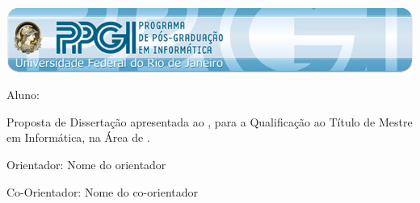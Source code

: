 


\begin{titlepage}

\begin{center}
\includegraphics[width=\textwidth]{ppgi.jpg}

\par
\vspace{80pt}
{\Huge \titulo}
\par
\vspace{30pt}
{\LARGE Aluno: \nomedoaluno}
\end{center}
\par
\vspace{90pt}
\hspace*{175pt}\parbox{7.6cm}{{\large Proposta de Dissertação apresentada ao \programa, para a Qualificação ao Título de Mestre em Informática, na Área de \areaprograma.}}

\par
\vspace{1em}
\hspace*{175pt}\parbox{7.6cm}{{\large Orientador: Nome do orientador}}
\par
\vspace{1em}
\hspace*{175pt}\parbox{7.6cm}{\large Co-Orientador: Nome do co-orientador}
\par
\vfill
\begin{center}
\textbf{{\large \localidade}\\
{\large \the\year}}
\end{center}
\end{titlepage}

